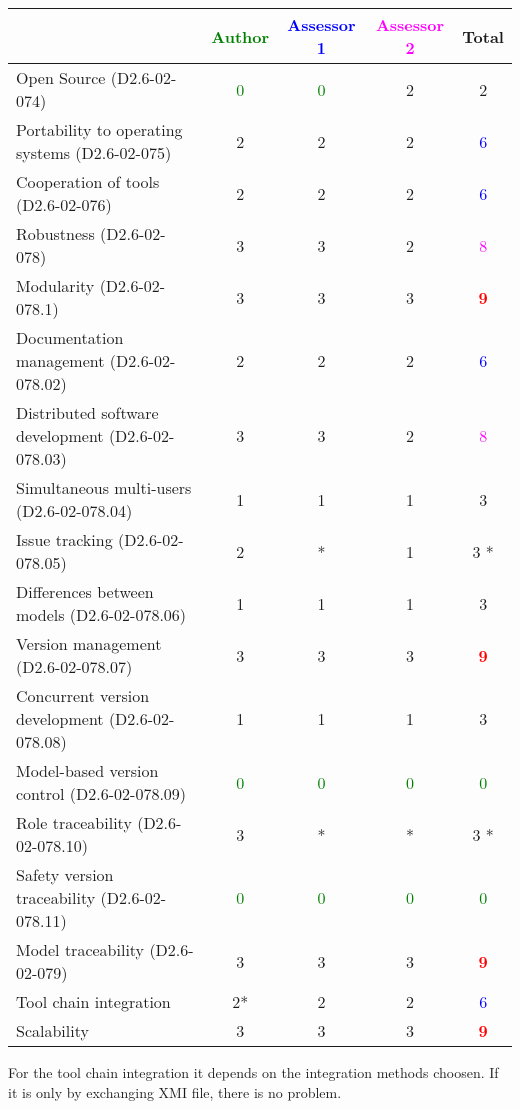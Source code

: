 \begin{tabular}{|l | c | c | c | c|}
\hline
& \textcolor{green}{Author} & \textcolor{blue}{Assessor 1} & \textcolor{magenta}{Assessor 2} & Total \\
\hline 
Open Source (D2.6-02-074) & \textcolor{green}{0}   & \textcolor{green}{0} & 2    & 2      \\
\hline 
Portability to operating systems (D2.6-02-075) &2 & 2    & 2     & \textcolor{blue}{6}  \\
\hline
Cooperation of tools (D2.6-02-076) &2 & 2    &2 & \textcolor{blue}{6}  \\
\hline
Robustness (D2.6-02-078) &3 &3 &2 & \textcolor{magenta}{8} \\
\hline
Modularity (D2.6-02-078.1) &3 &3 &3 & \textcolor{red}{\textbf{9}} \\
\hline
Documentation management (D2.6-02-078.02) & 2    & 2    &2 & \textcolor{blue}{6} \\
\hline
Distributed software development (D2.6-02-078.03)  &3 & 3    &2 & \textcolor{magenta}{8} \\
\hline
Simultaneous multi-users (D2.6-02-078.04)   &1 & 1    &1 & 3     \\
\hline
Issue tracking (D2.6-02-078.05) &2 & *& 1    & 3    * \\
\hline
Differences between models (D2.6-02-078.06) &1 & 1    &1 & 3     \\
\hline
Version management (D2.6-02-078.07) &3 & 3    & 3    & \textcolor{red}{\textbf{9}} \\
\hline
Concurrent version development (D2.6-02-078.08) &1 & 1    & 1    & 3     \\
\hline
Model-based version control (D2.6-02-078.09) & \textcolor{green}{0}   & \textcolor{green}{0} & \textcolor{green}{0} & \textcolor{green}{0} \\
\hline
Role traceability (D2.6-02-078.10) & 3    & *& * & 3    * \\
\hline
Safety version traceability (D2.6-02-078.11) & \textcolor{green}{0}   & \textcolor{green}{0}   & \textcolor{green}{0} & \textcolor{green}{0} \\
\hline
Model traceability (D2.6-02-079) &3 & 3    &3 & \textcolor{red}{\textbf{9}} \\
\hline
Tool chain integration &2* & 2    & 2     & \textcolor{blue}{6} \\
\hline
Scalability &3 & 3    &3 & \textcolor{red}{\textbf{9}} \\
\hline
\end{tabular}
\begin{author_comment}
For the tool chain integration it depends on the integration methods
choosen. If it is only by exchanging XMI file, there is no problem.
\end{author_comment}

